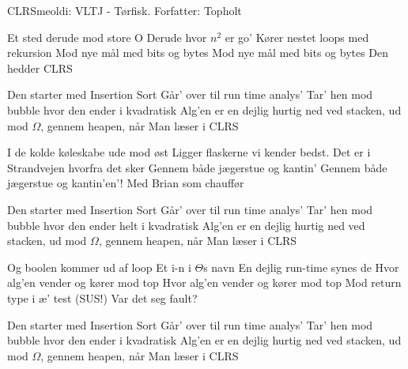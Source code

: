\begin{sang}{CLRS}{meoldi: VLTJ - Tørfisk. Forfatter: Topholt}
    \begin{vers}
    Et sted derude mod store O
    Derude hvor $n^2$ er go'
    Kører nestet loops med rekursion
    Mod nye mål med bits og bytes
    Mod nye mål med bits og bytes
    Den hedder CLRS
    \end{vers}
    
    \begin{omkvaed}
    Den starter med Insertion Sort
    Går' over til run time analys' 
    Tar' hen mod bubble hvor den ender i kvadratisk
    Alg'en er en dejlig hurtig ned ved stacken, ud mod $\Omega$, gennem heapen, når
    Man læser i CLRS
    \end{omkvaed}
    
    \begin{vers}
    I de kolde køleskabe ude mod øst
    Ligger flaskerne vi kender bedst.
    Det er i Strandvejen hvorfra det sker
    Gennem både jægerstue og kantin'
    Gennem både jægerstue og kantin'en'!
    Med Brian som chauffør
    \end{vers}
    
    \begin{omkvaed}
    Den starter med Insertion Sort
    Går' over til run time analys' 
    Tar' hen mod bubble hvor den ender helt i kvadratisk
    Alg'en er en dejlig hurtig ned ved stacken, ud mod $\Omega$, gennem heapen, når
    Man læser i CLRS
    \end{omkvaed}
    
    \begin{vers}
    Og boolen kommer ud af loop
    Et i-n i $\Theta$s navn
    En dejlig run-time synes de
    Hvor alg'en vender og kører mod top
    Hvor alg'en vender og kører mod top
    Mod return type i æ' test (SUS!)
    Var det seg fault?
    \end{vers}
    
    \begin{omkvaed}
    Den starter med Insertion Sort
    Går' over til run time analys' 
    Tar' hen mod bubble hvor den ender i kvadratisk
    Alg'en er en dejlig hurtig ned ved stacken, ud mod $\Omega$, gennem heapen, når
    Man læser i CLRS
    \end{omkvaed}
    \end{sang}